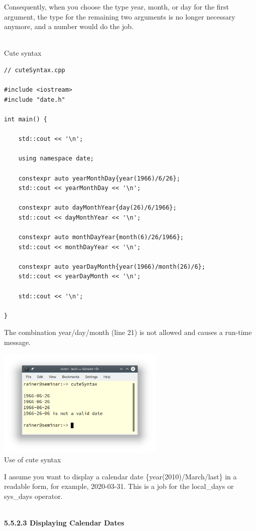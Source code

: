 Consequently, when you choose the type year, month, or day for the first argument, the type for the remaining two arguments is no longer necessary anymore, and a number would do the job.

\hspace*{\fill} \\ %
\noindent
Cute syntax
\begin{lstlisting}[style=styleCXX]
// cuteSyntax.cpp

#include <iostream>
#include "date.h"

int main() {
	
	std::cout << '\n';
	
	using namespace date;
	
	constexpr auto yearMonthDay{year(1966)/6/26};
	std::cout << yearMonthDay << '\n';
	
	constexpr auto dayMonthYear{day(26)/6/1966};
	std::cout << dayMonthYear << '\n';
	
	constexpr auto monthDayYear{month(6)/26/1966};
	std::cout << monthDayYear << '\n';
	
	constexpr auto yearDayMonth{year(1966)/month(26)/6};
	std::cout << yearDayMonth << '\n';
	
	std::cout << '\n';

}
\end{lstlisting}

The combination year/day/month (line 21) is not allowed and causes a run-time message.

\begin{center}
\includegraphics[width=0.6\textwidth]{content/3/chapter5/images/21.png}\\
Use of cute syntax
\end{center}

I assume you want to display a calendar date \{year(2010)/March/last\} in a readable form, for example, 2020-03-31. This is a job for the local\_days or sys\_days operator.

\hspace*{\fill} \\ %
\noindent
\textbf{5.5.2.3\hspace{0.2cm} Displaying Calendar Dates}

